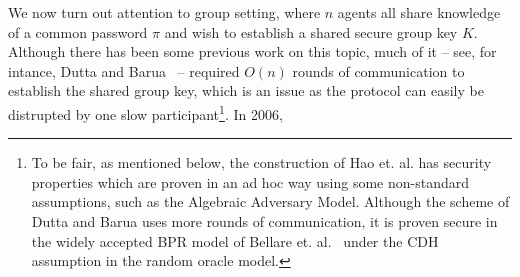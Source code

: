 We now turn out attention to group setting, where $n$ agents all share knowledge of a common password $\pi$ and wish to establish a shared secure group key $K$.  Although there has been some previous work on this topic, much of it -- see, for intance, Dutta and Barua~\cite{DuBa06} -- required $O(n)$ rounds of communication to establish the shared group key, which is an issue as the protocol can easily be distrupted by one slow participant\footnote{To be fair, as mentioned below, the construction of Hao et. al. has security properties which are proven in an ad hoc way using some non-standard assumptions, such as the Algebraic Adversary Model.  Although the scheme of Dutta and Barua uses more rounds of communication, it is proven secure in the widely accepted BPR model of Bellare et. al.~\cite{BePoRo00} under the CDH assumption in the random oracle model.}.  In 2006, 